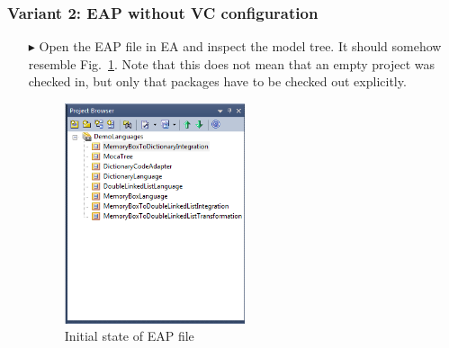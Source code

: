 \subsubsection{Variant 2: EAP without VC configuration}\label{sec:novcConfig}

\begin{enumerate}
  \item[$\blacktriangleright$] Open the EAP file in EA and inspect the model tree. 
  It should somehow resemble Fig.~\ref{fig:advanced-topics-eaSVN-initial}.
  Note that this does not mean that an empty project was checked in, but only that packages have to be checked out explicitly.
\begin{figure}[!htbp]
\begin{center}
	\includegraphics[width=0.5\textwidth]{pics/advancedTopics/eaSVN/DemoLanguages/001.png}
	\caption{Initial state of EAP file}
  	\label{fig:advanced-topics-eaSVN-initial}
\end{center}
\end{figure}


\end{enumerate}
